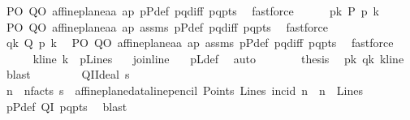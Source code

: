 \begin{isabellebody}
\ PO\ QO\ affine{\isacharunderscore}{\kern0pt}plane{\isachardot}{\kern0pt}a{}a\ ap\ pPdef\ pq{\isacharunderscore}{\kern0pt}diff\ pq{\isacharunderscore}{\kern0pt}pts\ \isamarkupfalse%
\ fastforce\isanewline
\ \ \ \ \isamarkupfalse%
\ pk{\isacharcolon}{\kern0pt}\ {\isachardoublequoteopen}P\ p{\isasymlhd}\ {\isacharquery}{\kern0pt}k{\isachardoublequoteclose}\ \isamarkupfalse%
\ PO\ QO\ affine{\isacharunderscore}{\kern0pt}plane{\isachardot}{\kern0pt}a{}a\ ap\ assms\ pPdef\ pq{\isacharunderscore}{\kern0pt}diff\ pq{\isacharunderscore}{\kern0pt}pts\ \isamarkupfalse%
\ fastforce\isanewline
\ \ \ \ \isamarkupfalse%
\ qk{\isacharcolon}{\kern0pt}\ {\isachardoublequoteopen}Q\ p{\isasymlhd}\ {\isacharquery}{\kern0pt}k{\isachardoublequoteclose}\ \isamarkupfalse%
\ PO\ QO\ affine{\isacharunderscore}{\kern0pt}plane{\isachardot}{\kern0pt}a{}a\ ap\ assms\ pPdef\ pq{\isacharunderscore}{\kern0pt}diff\ pq{\isacharunderscore}{\kern0pt}pts\ \isamarkupfalse%
\ fastforce\isanewline
\ \ \ \ \isamarkupfalse%
\ kline{\isacharcolon}{\kern0pt}\ {\isachardoublequoteopen}{\isacharquery}{\kern0pt}k\ {\isasymin}\ pLines{\isachardoublequoteclose}\ \isamarkupfalse%
\ \ join{\isacharunderscore}{\kern0pt}line\ \ \isamarkupfalse%
\ pLdef\ \isamarkupfalse%
\ auto\isanewline
\ \ \ \ \isamarkupfalse%
\ \isamarkupfalse%
\ {\isacharquery}{\kern0pt}thesis\ \isamarkupfalse%
\ pk\ qk\ kline\ \isamarkupfalse%
\ blast\isanewline
\ \ \isamarkupfalse%
\isanewline
\ \ \ \ \isamarkupfalse%
\ QI{\isacharcolon}{\kern0pt}{\isacharparenleft}{\kern0pt}Ideal\ s{\isacharparenright}{\kern0pt}\isanewline
\ \ \ \ \isamarkupfalse%
\ n\ \ n{\isacharunderscore}{\kern0pt}facts{\isacharcolon}{\kern0pt}\ {\isachardoublequoteopen}s\ {\isacharequal}{\kern0pt}\ affine{\isacharunderscore}{\kern0pt}plane{\isacharunderscore}{\kern0pt}data{\isachardot}{\kern0pt}line{\isacharunderscore}{\kern0pt}pencil\ Points\ Lines\ {\isacharparenleft}{\kern0pt}incid{\isacharparenright}{\kern0pt}\ n\ {\isasymand}\ n\ {\isasymin}\ Lines{\isachardoublequoteclose}\ \isamarkupfalse%
\ pPdef\ QI\ pq{\isacharunderscore}{\kern0pt}pts\ \isamarkupfalse%
\ blast\ \isanewline
\ \ \ \ \isamarkupfalse%

\end{isabellebody}

